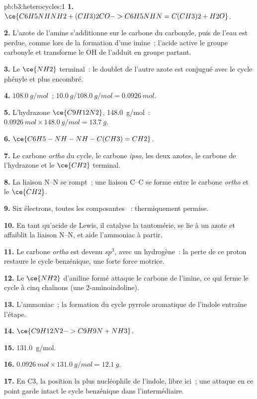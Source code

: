 \begin{solution}{pb:b3:heterocycles:1}
\textbf{1.} $\ce{C6H5NHNH2 + (CH3)2CO -> C6H5NHN=C(CH3)2 + H2O}$.

\textbf{2.} L'azote de l'amine s'additionne sur le carbone du carbonyle,
puis de l'eau est perdue, comme lors de la formation d'une imine~; l'acide
active le groupe carbonyle et transforme le OH de l'adduit en groupe
partant.

\textbf{3.} Le $\ce{NH2}$ terminal~: le doublet de l'autre azote est conjugué avec le
cycle phényle et plus encombré.

\textbf{4.} $\qty{108.0}{g/mol}$~; $\qty{10.0}{g}/\qty{108.0}{g/mol} = \qty{0.0926}{mol}$.

\textbf{5.} L'hydrazone $\ce{C9H12N2}$, \qty{148.0}{g/mol}~: $\qty{0.0926}{mol} \times \qty{148.0}{g/mol} = \qty{13.7}{g}$.

\textbf{6.} $\ce{C6H5-NH-NH-C(CH3)=CH2}$.

\textbf{7.} Le carbone \textit{ortho} du cycle, le carbone \textit{ipso}, les deux azotes, le carbone de
l'hydrazone et le $\ce{CH2}$ terminal.

\textbf{8.} La liaison N--N se rompt~; une liaison C--C se forme entre le carbone \textit{ortho} et le $\ce{CH2}$.

\textbf{9.} Six électrons, toutes les composantes ~: thermiquement permise.

\textbf{10.} En tant qu'acide de Lewis, il catalyse la tautomérie, se lie à
un azote et affaiblit la liaison N--N, et aide l'ammoniac à partir.

\textbf{11.} Le carbone \textit{ortho} est devenu $sp^3$, avec un hydrogène~: la perte de ce proton
restaure le cycle benzénique, une forte force motrice.

\textbf{12.} Le $\ce{NH2}$ d'aniline formé attaque le carbone de l'imine, ce qui ferme le
cycle à cinq chaînons (une 2-aminoindoline).

\textbf{13.} L'ammoniac~; la formation du cycle pyrrole aromatique de l'indole entraîne l'étape.

\textbf{14.} $\ce{C9H12N2 -> C9H9N + NH3}$.

\textbf{15.} \qty{131.0}{g/mol}.

\textbf{16.} $\qty{0.0926}{mol} \times \qty{131.0}{g/mol} = \qty{12.1}{g}$.

\textbf{17.} En C3, la position la plus nucléophile de l'indole, libre
ici~; une attaque en ce point garde intact le cycle benzénique dans
l'intermédiaire.


\end{solution}
